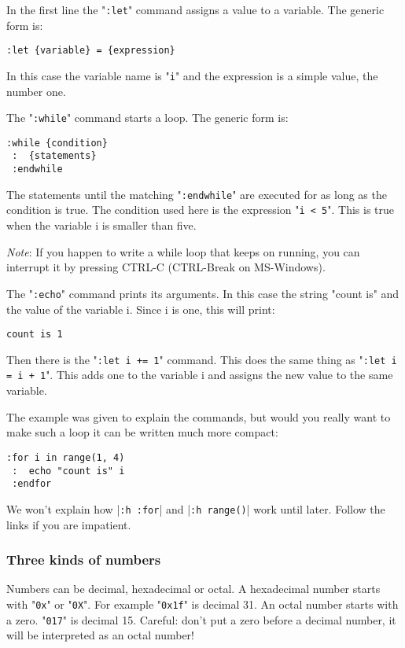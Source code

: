 In the first line the "\texttt{:let}" command assigns a value to a variable.
The generic form is:

\begin{Verbatim}[samepage=true]
 :let {variable} = {expression}
\end{Verbatim}

In this case the variable name is "\texttt{i}" and the expression is a simple value, the number one.

The "\texttt{:while}" command starts a loop.
The generic form is:

\begin{Verbatim}[samepage=true]
 :while {condition}
 :  {statements}
 :endwhile
\end{Verbatim}

The statements until the matching "\texttt{:endwhile}" are executed for as long as the condition is true.
The condition used here is the expression "\texttt{i < 5}".
This is true when the variable i is smaller than five.

\emph{Note}: If you happen to write a while loop that keeps on running, you can interrupt it by pressing CTRL-C (CTRL-Break on MS-Windows).

The "\texttt{:echo}" command prints its arguments.
In this case the string "count is" and the value of the variable i.
Since i is one, this will print:

\begin{Verbatim}[samepage=true]
    count is 1
\end{Verbatim}

Then there is the "\texttt{:let i += 1}" command.
This does the same thing as "\texttt{:let i = i + 1}".
This adds one to the variable i and assigns the new value to the same variable.

The example was given to explain the commands, but would you really want to make such a loop it can be written much more compact:

\begin{Verbatim}[samepage=true]
 :for i in range(1, 4)
 :  echo "count is" i
 :endfor
\end{Verbatim}

We won't explain how |\texttt{:h :for}| and |\texttt{:h range()}| work until later.
Follow the links if you are impatient.

\subsubsection{Three kinds of numbers}
Numbers can be decimal, hexadecimal or octal.
A hexadecimal number starts with "\texttt{0x}" or "\texttt{0X}".
For example "\texttt{0x1f}" is decimal 31.
An octal number starts with a zero.
"\texttt{017}" is decimal 15.
Careful: don't put a zero before a decimal number, it will be interpreted as an octal number!

